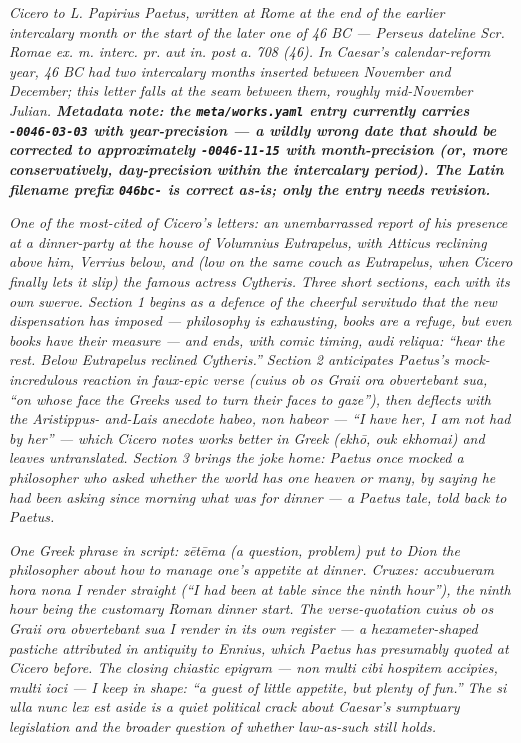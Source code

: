 
\textit{Cicero to L. Papirius Paetus, written at Rome at the end of
the earlier intercalary month or the start of the later one of
46 BC --- Perseus dateline \textit{Scr. Romae ex. m. interc. pr.
aut in. post a. 708 (46)}. In Caesar's calendar-reform year, 46
BC had two intercalary months inserted between November and
December; this letter falls at the seam between them, roughly
mid-November Julian. \textbf{Metadata note: the
\texttt{meta/works.yaml} entry currently carries
\texttt{-0046-03-03} with year-precision --- a wildly wrong date
that should be corrected to approximately \texttt{-0046-11-15}
with month-precision (or, more conservatively, day-precision
within the intercalary period). The Latin filename prefix
\texttt{046bc-} is correct as-is; only the entry needs revision.}}

\textit{One of the most-cited of Cicero's letters: an unembarrassed
report of his presence at a dinner-party at the house of
Volumnius Eutrapelus, with Atticus reclining above him, Verrius
below, and (low on the same couch as Eutrapelus, when Cicero
finally lets it slip) the famous actress Cytheris. Three short
sections, each with its own swerve. Section 1 begins as a defence
of the cheerful \textit{servitudo} that the new dispensation has
imposed --- philosophy is exhausting, books are a refuge, but
even books have their measure --- and ends, with comic timing,
\textit{audi reliqua}: ``hear the rest. Below Eutrapelus
reclined Cytheris.'' Section 2 anticipates Paetus's mock-
incredulous reaction in faux-epic verse (\textit{cuius ob os
Graii ora obvertebant sua}, ``on whose face the Greeks used to
turn their faces to gaze''), then deflects with the Aristippus-
and-Lais anecdote \textit{habeo, non habeor} --- ``I have her, I
am not had by her'' --- which Cicero notes works better in Greek
(\textit{ekh\=o, ouk ekhomai}) and leaves untranslated. Section
3 brings the joke home: Paetus once mocked a philosopher who
asked whether the world has one heaven or many, by saying he had
been asking since morning what was for dinner --- a Paetus tale,
told back to Paetus.}

\textit{One Greek phrase in script: \textit{z\=et\=ema} (a question,
problem) put to Dion the philosopher about how to manage one's
appetite at dinner. Cruxes: \textit{accubueram hora nona} I
render straight (``I had been at table since the ninth hour''),
the ninth hour being the customary Roman dinner start. The
verse-quotation \textit{cuius ob os Graii ora obvertebant sua} I
render in its own register --- a hexameter-shaped pastiche
attributed in antiquity to Ennius, which Paetus has presumably
quoted at Cicero before. The closing chiastic epigram ---
\textit{non multi cibi hospitem accipies, multi ioci} --- I keep
in shape: ``a guest of little appetite, but plenty of fun.''
The \textit{si ulla nunc lex est} aside is a quiet political
crack about Caesar's sumptuary legislation and the broader
question of whether law-as-such still holds.}
